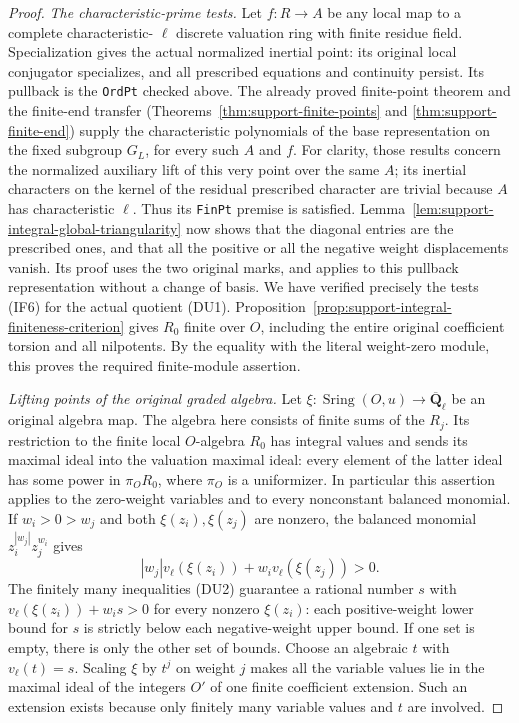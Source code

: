 \begin{proof}
\emph{The characteristic-prime tests.}
Let $f:R\to A$ be any local map to a complete characteristic-
$\ell$ discrete valuation ring with finite residue field.
Specialization gives the actual normalized inertial point:
its original local conjugator specializes, and all prescribed
equations and continuity persist.  Its pullback is the
\texttt{OrdPt} checked above.  The already proved
finite-point theorem and the finite-end transfer
(Theorems~\ref{thm:support-finite-points} and
\ref{thm:support-finite-end}) supply the characteristic
polynomials of the base representation on the fixed
subgroup $G_L$, for every such $A$ and $f$.
For clarity, those results concern the normalized auxiliary
lift of this very point over the same $A$; its inertial
characters on the kernel of the residual prescribed
character are trivial because $A$ has characteristic $\ell$.
Thus its \texttt{FinPt} premise is satisfied.
Lemma~\ref{lem:support-integral-global-triangularity}
now shows that the diagonal entries are the prescribed ones,
and that all the positive or all the negative weight
displacements vanish.  Its proof uses the two original
marks, and applies to this pullback representation without
a change of basis.  We have verified precisely the tests
(IF6) for the actual quotient (DU1).
Proposition~\ref{prop:support-integral-finiteness-criterion}
gives $R_0$ finite over $O$, including the entire original
coefficient torsion and all nilpotents.  By the equality with
the literal weight-zero module, this proves the required
finite-module assertion.

\emph{Lifting points of the original graded algebra.}
Let $\xi:\operatorname{Sring}(O,u)\to
\overline{\mathbf Q}_\ell$ be an original algebra map.
The algebra here consists of finite sums of the $R_j$.
Its restriction to the finite local $O$-algebra $R_0$
has integral values and sends its maximal ideal into
the valuation maximal ideal: every element of the latter
ideal has some power in $\pi_O R_0$, where $\pi_O$ is a
uniformizer.  In particular this assertion applies to the
zero-weight variables and to every nonconstant balanced
monomial.  If $w_i>0>w_j$ and both $\xi(z_i),\xi(z_j)$
are nonzero, the balanced monomial
$z_i^{|w_j|}z_j^{w_i}$ gives
\[
       |w_j|v_\ell(\xi(z_i))+w_i v_\ell(\xi(z_j))>0.           \tag{DU2}
\]
The finitely many inequalities (DU2) guarantee a rational
number $s$ with
$v_\ell(\xi(z_i))+w_i s>0$ for every nonzero $\xi(z_i)$:
each positive-weight lower bound for $s$ is strictly below
each negative-weight upper bound.  If one set is empty,
there is only the other set of bounds.  Choose an algebraic
$t$ with $v_\ell(t)=s$.  Scaling $\xi$ by $t^j$ on weight
$j$ makes all the variable values lie in the maximal ideal
of the integers $O'$ of one finite coefficient extension.
Such an extension exists because only finitely many variable
values and $t$ are involved.


\end{proof}
